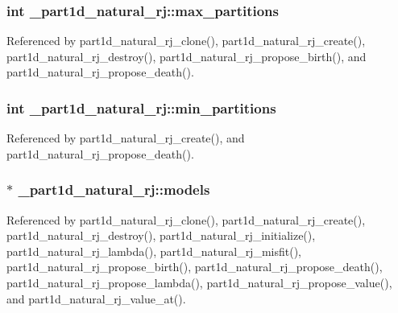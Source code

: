 \subsubsection[{\texorpdfstring{max\+\_\+partitions}{max_partitions}}]{\setlength{\rightskip}{0pt plus 5cm}int \+\_\+part1d\+\_\+natural\+\_\+rj\+::max\+\_\+partitions}\hypertarget{struct__part1d__natural__rj_a4c63d3589ddf066362e9c1aeeff6cc40}{}\label{struct__part1d__natural__rj_a4c63d3589ddf066362e9c1aeeff6cc40}


Referenced by part1d\+\_\+natural\+\_\+rj\+\_\+clone(), part1d\+\_\+natural\+\_\+rj\+\_\+create(), part1d\+\_\+natural\+\_\+rj\+\_\+destroy(), part1d\+\_\+natural\+\_\+rj\+\_\+propose\+\_\+birth(), and part1d\+\_\+natural\+\_\+rj\+\_\+propose\+\_\+death().

\subsubsection[{\texorpdfstring{min\+\_\+partitions}{min_partitions}}]{\setlength{\rightskip}{0pt plus 5cm}int \+\_\+part1d\+\_\+natural\+\_\+rj\+::min\+\_\+partitions}\hypertarget{struct__part1d__natural__rj_a6969dd7fd19ea22e56d7ae5d98628118}{}\label{struct__part1d__natural__rj_a6969dd7fd19ea22e56d7ae5d98628118}


Referenced by part1d\+\_\+natural\+\_\+rj\+\_\+create(), and part1d\+\_\+natural\+\_\+rj\+\_\+propose\+\_\+death().

\subsubsection[{\texorpdfstring{models}{models}}]{$\ast$ \+\_\+part1d\+\_\+natural\+\_\+rj\+::models}\hypertarget{struct__part1d__natural__rj_a9176ec71daa9e38e433a99d2bb26812d}{}\label{struct__part1d__natural__rj_a9176ec71daa9e38e433a99d2bb26812d}


Referenced by part1d\+\_\+natural\+\_\+rj\+\_\+clone(), part1d\+\_\+natural\+\_\+rj\+\_\+create(), part1d\+\_\+natural\+\_\+rj\+\_\+destroy(), part1d\+\_\+natural\+\_\+rj\+\_\+initialize(), part1d\+\_\+natural\+\_\+rj\+\_\+lambda(), part1d\+\_\+natural\+\_\+rj\+\_\+misfit(), part1d\+\_\+natural\+\_\+rj\+\_\+propose\+\_\+birth(), part1d\+\_\+natural\+\_\+rj\+\_\+propose\+\_\+death(), part1d\+\_\+natural\+\_\+rj\+\_\+propose\+\_\+lambda(), part1d\+\_\+natural\+\_\+rj\+\_\+propose\+\_\+value(), and part1d\+\_\+natural\+\_\+rj\+\_\+value\+\_\+at().

